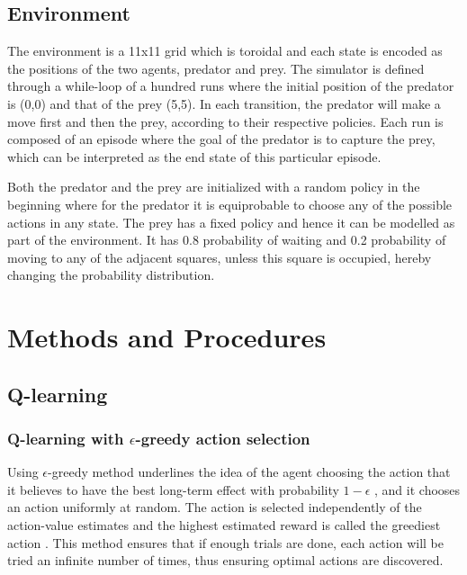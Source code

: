 \documentclass[paper=a4, fontsize=11pt]{scrartcl}
\numberwithin{equation}{section}		%
\numberwithin{figure}{section}			%
\numberwithin{table}{section}				%
\begin{document}
\subsection{Environment}
\label{environment}
The environment is a 11x11 grid which is toroidal and each state is encoded as the positions of the two agents, predator and prey.
The simulator is defined through a while-loop of a hundred runs where the initial position of the predator is (0,0) and that of the prey (5,5). In each transition, the predator will make a move first and then the prey, according to their respective policies. Each run is composed of an episode where the goal of the predator is to capture the prey, which can be interpreted as the end state of this particular episode. 

Both the predator and the prey are initialized with a random policy in the beginning where for the predator it is equiprobable to choose any of the possible actions %
in any state. The prey has a fixed policy and hence it can be modelled as part of the environment. It has 0.8 probability of waiting and 0.2 probability of moving to any of the adjacent squares, unless this square is occupied, hereby changing the probability distribution.

\section{Methods and Procedures}
\label{methods}
\subsection{\textbf {Q-learning}}
\subsubsection*{Q-learning with $\epsilon$-greedy action selection}
Using $\epsilon$-greedy method underlines the idea of the agent choosing the action that it believes to have the best long-term effect with probability $1-\epsilon$ , and it chooses an action uniformly at random. The action is selected independently of the action-value estimates and the highest estimated reward is called the greediest action . This method ensures that if enough trials are done, each action will be tried an infinite number of times, thus ensuring optimal actions are discovered.
\end{document}
